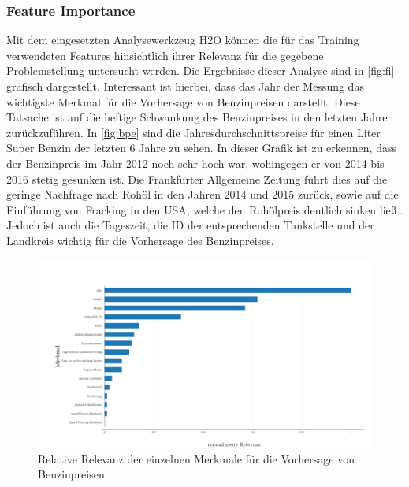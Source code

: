 \documentclass[
ngerman          %
,a4paper          %
,11pt
,pdftex
]{report}
\begin{document}
\subsubsection*{Feature Importance}
Mit dem eingesetzten Analysewerkzeug H2O können die für das Training verwendeten Features hinsichtlich ihrer Relevanz für die gegebene Problemstellung untersucht werden. Die Ergebnisse dieser Analyse sind in \autoref{fig:fi} grafisch dargestellt. Interessant ist hierbei, dass das Jahr der Messung das wichtigste Merkmal für die Vorhersage von Benzinpreisen darstellt. Diese Tatsache ist auf die heftige Schwankung des Benzinpreises in den letzten Jahren zurückzuführen. In \autoref{fig:bpe} sind die Jahresdurchschnittspreise für einen Liter Super Benzin der letzten 6 Jahre zu sehen. In dieser Grafik ist zu erkennen, dass der Benzinpreis im Jahr 2012 noch sehr hoch war, wohingegen er von 2014 bis 2016 stetig gesunken ist. Die Frankfurter Allgemeine Zeitung führt dies auf die geringe Nachfrage nach Rohöl in den Jahren 2014 und 2015 zurück, sowie auf die Einführung von Fracking in den USA, welche den Rohölpreis deutlich sinken ließ \cite{faz}. Jedoch ist auch die Tageszeit, die ID der entsprechenden Tankstelle und der Landkreis wichtig für die Vorhersage des Benzinpreises.
\begin{figure}
\centering
\includegraphics[width=\linewidth]{features720p.png}
\caption{Relative Relevanz der einzelnen Merkmale für die Vorhersage von Benzinpreisen.}
\label{fig:fi}
\end{figure}
\end{document}
